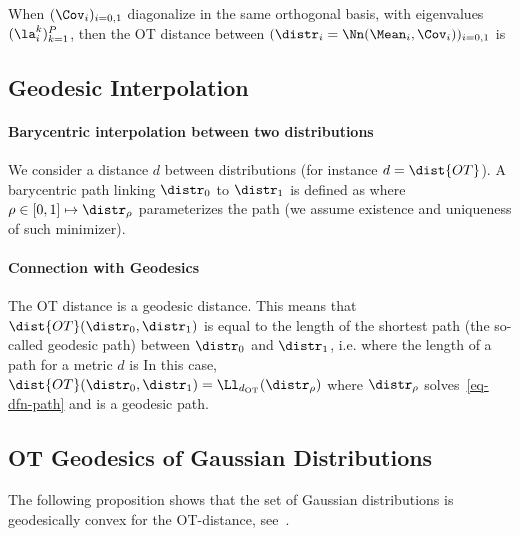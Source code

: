When $(\Cov_i)_{i=0,1}$ diagonalize in the same orthogonal basis, with eigenvalues $(\la_i^k)_{k=1}^P$, then the OT distance between $(\distr_i = \Nn(\Mean_i,\Cov_i))_{i=0,1}$ is


\subsection{Geodesic Interpolation}

\paragraph{Barycentric interpolation between two distributions}

We consider a distance $d$ between distributions (for instance $d=\dist{OT}$). A barycentric path linking $\distr_0$ to $\distr_1$ is defined as
where $\rho \in [0,1] \mapsto \distr_\rho$ parameterizes the path (we assume existence and uniqueness of such minimizer). 

\paragraph{Connection with Geodesics}

The OT distance is a geodesic distance. This means that $\dist{OT}(\distr_0,\distr_1)$ is equal to the length of the shortest path (the so-called geodesic path) between $\distr_0$ and $\distr_1$, i.e.
where the length of a path for a metric $d$ is
In this case, $\dist{OT}(\distr_0,\distr_1) = \Ll_{d_\text{OT}}(\distr_\rho)$ where $\distr_\rho$ solves~\eqref{eq-dfn-path} and is a geodesic path. 


\subsection{OT Geodesics of Gaussian Distributions}

The following proposition shows that the set of Gaussian distributions is geodesically convex for the OT-distance, see~\cite{takatsu-wasserstein-gaussian}.

